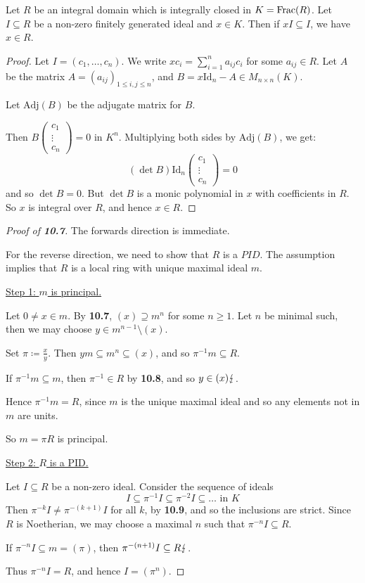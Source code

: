 \documentclass[10pt,a4paper]{article}
\begin{document}
\begin{lemma}
  Let $R$ be an integral domain which is integrally closed in $K = \operatorname{Frac}(R)$. Let $I \subseteq R$ be a non-zero finitely generated ideal and $x \in K$. Then if $xI \subseteq I$, we have $x \in R$.
\end{lemma}
\begin{proof}
  Let $I = (c_1, \ldots, c_n)$. We write $xc_i = \sum_{i=1}^n a_{ij}c_i$ for some $a_{ij} \in R$. Let $A$ be the matrix $A = (a_{ij})_{1\leq i,j\leq n}$, and $B = x\text{Id}_n - A \in M_{n\times n}(K)$.

  Let $\text{Adj}(B)$ be the adjugate matrix for $B$.

  Then $B \begin{pmatrix}c_1\\\vdots\\c_n\end{pmatrix} = 0$ in $K^n$. Multiplying both sides by $\text{Adj}(B)$, we get:
  \[(\det B)\text{Id}_n\begin{pmatrix} c_1\\\vdots\\ c_n\end{pmatrix} = 0\]
  and so $\det B = 0$. But $\det B$ is a monic polynomial in $x$ with coefficients in $R$. So $x$ is integral over $R$, and hence $x \in R$.
\end{proof}
\begin{proof}[Proof of \textbf{10.7}]
  The forwards direction is immediate.

  For the reverse direction, we need to show that $R$ is a $PID$. The assumption implies that $R$ is a local ring with unique maximal ideal $m$.

  \underline{Step 1: $m$ is principal.}

  Let $0 \neq x \in m$. By \textbf{10.7}, $(x) \supseteq m^n$ for some $n \geq 1$. Let $n$ be minimal such, then we may choose $y \in m^{n-1}\setminus (x)$.

  Set $\pi \coloneqq \frac{x}{y}$. Then $ym \subseteq m^n \subseteq (x)$, and so $\pi^{-1}m \subseteq R$.

  If $\pi^{-1}m \subseteq m$, then $\pi^{-1} \in R$ by \textbf{10.8}, and so $y \in (x)\lightning$.

  Hence $\pi^{-1}m =R$, since $m$ is the unique maximal ideal and so any elements not in $m$ are units.

  So $m = \pi R$ is principal.

  \underline{Step 2: $R$ is a PID.}

  Let $I \subseteq R$ be a non-zero ideal. Consider the sequence of ideals
  \[ I \subseteq \pi^{-1}I \subseteq \pi^{-2} I \subseteq \ldots \text{ in $K$}\]
  Then $\pi^{-k}I \neq \pi^{-(k+1)}I$ for all $k$, by \textbf{10.9}, and so the inclusions are strict. Since $R$ is Noetherian, we may choose a maximal $n$ such that $\pi^{-n}I \subseteq R$.

  If $\pi^{-n}I \subseteq m = (\pi)$, then $\pi^{-(n+1)} I \subseteq R\lightning$.

  Thus $\pi^{-n}I = R$, and hence $I = (\pi^n)$.
\end{proof}
\end{document}
